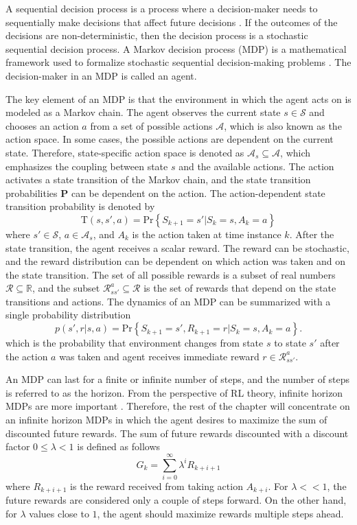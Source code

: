 \documentclass[english, 12pt, a4paper, elec, utf8, a-1b, online]{aaltothesis}
\numberwithin{equation}{section}
\renewcommand{\vec}[1]{\mathbf{#1}}
\newcommand{\Ss}{\mathcal{S}}
\newcommand{\As}{\mathcal{A}}
\newcommand{\Rs}{\mathcal{R}}
\renewcommand{\Pr}[1]{\text{Pr}\left\{ #1 \right\}}
\newcommand{\stprobs}{\vec{P}}
\newcommand{\real}{\mathbb{R}}
\begin{document}
A sequential decision process is a process where a decision-maker needs to sequentially make decisions that affect future decisions \cite{LaValle2006}.
If the outcomes of the decisions are non-deterministic, then the decision process is a stochastic sequential decision process.
A Markov decision process (MDP) is a mathematical framework used to formalize stochastic sequential decision-making problems \cite{Sutton2018}.
The decision-maker in an MDP is called an agent.

The key element of an MDP is that the environment in which the agent acts on is modeled as a Markov chain.
The agent observes the current state $s \in \Ss$ and chooses an action $a$ from a set of possible actions $\As$, which is also known as the action space.
In some cases, the possible actions are dependent on the current state.
Therefore, state-specific action space is denoted as $\As_s \subseteq \As$, which emphasizes the coupling between state $s$ and the available actions. 
The action activates a state transition of the Markov chain, and the state transition probabilities $\stprobs$ can be dependent on the action.
The action-dependent state transition probability is denoted by 
\begin{equation}\label{eq:mdp_st_prob}
    \mathrm{T}(s, s', a) = \Pr{S_{k+1}=s' | S_{k}=s , A_k=a}
\end{equation}
where $s' \in \Ss$, $a \in \As_s$, and $A_k$ is the action taken at time instance $k$.  
After the state transition, the agent receives a scalar reward.
The reward can be stochastic, and the reward distribution can be dependent on which action was taken and on the state transition.
The set of all possible rewards is a subset of real numbers $\Rs \subseteq \real$, and the subset $\Rs_{ss'}^a \subseteq \Rs$ is the set of rewards that depend on the state transitions and actions.
The dynamics of an MDP can be summarized with a single probability distribution
\begin{equation}\label{eq:MDP_probs}
    p(s', r | s, a) = \Pr{ S_{k+1}=s', R_{k+1}=r | S_k=s, A_k=a }.
\end{equation}
which is the probability that environment changes from state $s$ to state $s'$ after the action $a$ was taken and agent receives immediate reward $r \in \Rs_{ss'}^a$.

An MDP can last for a finite or infinite number of steps, and the number of steps is referred to as the horizon.
From the perspective of RL theory, infinite horizon MDPs are more important \cite{Sutton2018}.
Therefore, the rest of the chapter will concentrate on an infinite horizon MDPs in which the agent desires to maximize the sum of discounted future rewards.
The sum of future rewards discounted with a discount factor $0 \leq \lambda < 1$ is defined as follows
\begin{equation}\label{eq:discounted_sum}
    G_k = \sum_{i=0}^{\infty} \lambda^i R_{k + i + 1}
\end{equation}
where $R_{k+i+1}$ is the reward received from taking action $A_{k+i}$.
For $\lambda << 1$, the future rewards are considered only a couple of steps forward.
On the other hand, for $\lambda$ values close to $1$, the agent should maximize rewards multiple steps ahead.
\end{document}
